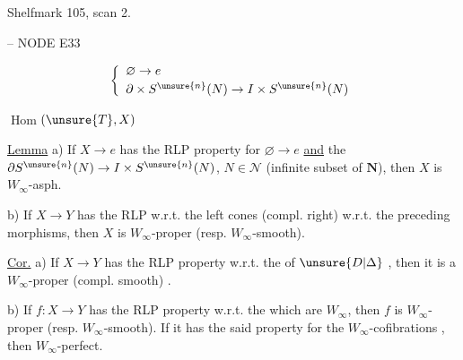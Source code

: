 Shelfmark 105, scan 2.

 -- NODE E33




\[
\left\{\begin{array}{l}
\varnothing\to e\\[2pt]
\partial\times S^{\unsure{n}}(N)\to I\times S^{\unsure{n}}(N)
\end{array}\right.
\]

\uline{$\operatorname{Hom}$}$(\unsure{T},X)$

\uline{Lemma} a) If $X\to e$ has the RLP property  for $\varnothing\to e$ \uline{and} the $\partial S^{\unsure{n}}(N)\to I\times S^{\unsure{n}}(N)$, $N\in\mathcal N$ (infinite subset of $\mathbf N$), then $X$ is $W_\infty$-asph.

b) If $X\to Y$ has the RLP w.r.t. the left cones (compl. right) w.r.t. the preceding morphisms, then $X$ is $W_\infty$-proper (resp. $W_\infty$-smooth).

\uline{Cor.} a) If $X\to Y$ has the RLP property w.r.t. the  of $\unsure{D|\Delta}$    , then it is a $W_\infty$-proper (compl. smooth)  .

b) If $f\colon X\to Y$ has the RLP property w.r.t. the     which are $W_\infty$, then $f$ is $W_\infty$-proper (resp. $W_\infty$-smooth).
If it has the said property for the  $W_\infty$-cofibrations , then  $W_\infty$-perfect.

